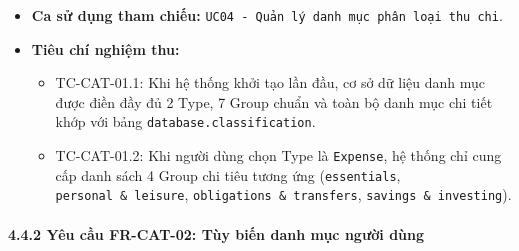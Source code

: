 \documentclass[11pt,a4paper]{article}
\providecommand{\tightlist}{
  \setlength{\itemsep}{0pt}\setlength{\parskip}{0pt}}
\begin{document}
\begin{itemize}
  \begin{itemize}
  \tightlist
  \item
    Cây danh mục phân cấp 3 tầng hoàn chỉnh được nạp vào bộ nhớ hệ
    thống.
  \item
    Danh sách danh mục sẵn sàng cho việc lựa chọn và phân tích báo cáo.
  \end{itemize}
\item
  \textbf{Ca sử dụng tham chiếu:}
  \texttt{UC04\ -\ Quản\ lý\ danh\ mục\ phân\ loại\ thu\ chi}.
\item
  \textbf{Tiêu chí nghiệm thu:}

  \begin{itemize}
  \tightlist
  \item
    TC-CAT-01.1: Khi hệ thống khởi tạo lần đầu, cơ sở dữ liệu danh mục
    được điền đầy đủ 2 Type, 7 Group chuẩn và toàn bộ danh mục chi tiết
    khớp với bảng \texttt{database.classification}.
  \item
    TC-CAT-01.2: Khi người dùng chọn Type là \texttt{Expense}, hệ thống
    chỉ cung cấp danh sách 4 Group chi tiêu tương ứng
    (\texttt{essentials}, \texttt{personal\ \&\ leisure},
    \texttt{obligations\ \&\ transfers},
    \texttt{savings\ \&\ investing}).
  \end{itemize}
\end{itemize}

\newpage

\paragraph{4.4.2 Yêu cầu FR-CAT-02: Tùy biến danh mục người
dùng}\label{442-yuxeau-cux1ea7u-fr-cat-02-tuxf9y-biux1ebfn-danh-mux1ee5c-ngux1b0ux1eddi-duxf9ng}
\end{document}
